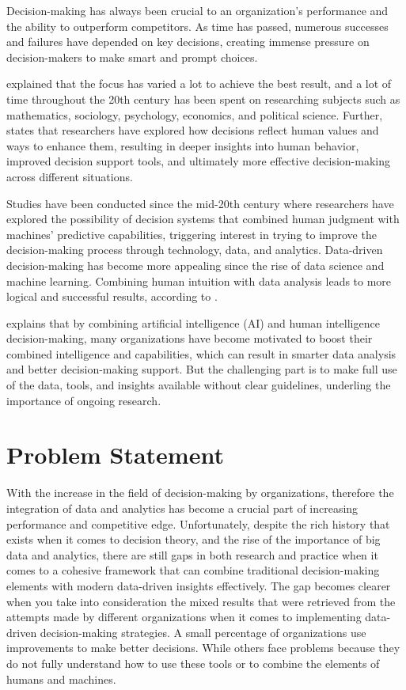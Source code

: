 Decision-making has always been crucial to an organization’s performance and the ability to outperform competitors.  As time has passed, numerous successes and failures have depended on key decisions, creating immense pressure on decision-makers to make smart and prompt choices.

\cite{DECAS} explained that the focus has varied a lot to achieve the best result, and a lot of time throughout the 20th century has been spent on researching subjects such as mathematics, sociology, psychology, economics, and political science. Further, \cite{DECAS} states that researchers have explored how decisions reflect human values and ways to enhance them, resulting in deeper insights into human behavior, improved decision support tools, and ultimately more effective decision-making across different situations.

Studies have been conducted since the mid-20th century where researchers have explored the possibility of decision systems that combined human judgment with machines’ predictive capabilities, triggering interest in trying to improve the decision-making process through technology, data, and analytics. Data-driven decision-making has become more appealing since the rise of data science and machine learning. Combining human intuition with data analysis leads to more logical and successful results, according to \cite{DECAS}.

\cite{DECAS} explains that by combining artificial intelligence (AI) and human intelligence decision-making, many organizations have become motivated to boost their combined intelligence and capabilities, which can result in smarter data analysis and better decision-making support. But the challenging part is to make full use of the data, tools, and insights available without clear guidelines, underling the importance of ongoing research. 

\section{Problem Statement}

With the increase in the field of decision-making by organizations, therefore the integration of data and analytics has become a crucial part of increasing performance and competitive edge. Unfortunately, despite the rich history that exists when it comes to decision theory, and the rise of the importance of big data and analytics, there are still gaps in both research and practice when it comes to a cohesive framework that can combine traditional decision-making elements with modern data-driven insights effectively. The gap becomes clearer when you take into consideration the mixed results that were retrieved from the attempts made by different organizations when it comes to implementing data-driven decision-making strategies. A small percentage of organizations use improvements to make better decisions. While others face problems because they do not fully understand how to use these tools or to combine the elements of humans and machines.


